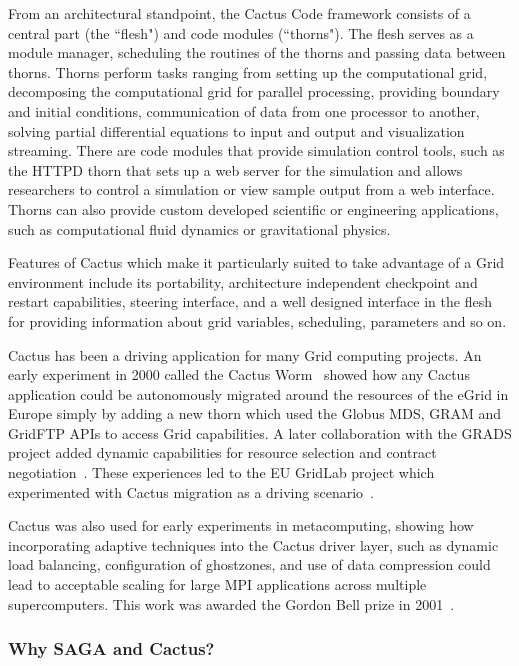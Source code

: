 \documentclass[conference,final]{IEEEtran}
\begin{document}
From an architectural standpoint, the Cactus Code framework consists
of a central part (the ``flesh") and code modules (``thorns").  The
flesh serves as a module manager, scheduling the routines of the
thorns and passing data between thorns.  Thorns perform tasks ranging
from setting up the computational grid, decomposing the computational
grid for parallel processing, providing boundary and initial
conditions, communication of data from one processor to another,
solving partial differential equations to input and output and
visualization streaming. There are code modules that provide
simulation control tools, such as the HTTPD thorn that sets up a web
server for the simulation and allows researchers to control a
simulation or view sample output from a web interface.  Thorns can
also provide custom developed scientific or engineering applications,
such as computational fluid dynamics or gravitational physics.

Features of Cactus which make it particularly suited to take advantage
of a Grid environment include its portability, architecture
independent checkpoint and restart capabilities, steering interface,
and a well designed interface in the flesh for providing information
about grid variables, scheduling, parameters and so on.

Cactus has been a driving application for many Grid computing
projects.  An early experiment in 2000 called the Cactus
Worm~\cite{X1} showed how any Cactus application could be autonomously
migrated around the resources of the eGrid in Europe simply by adding
a new thorn which used the Globus MDS, GRAM and GridFTP APIs to access
Grid capabilities. A later collaboration with the GRADS project added
dynamic capabilities for resource selection and contract
negotiation~\cite{X2}.  These experiences led to the EU GridLab
project which experimented with Cactus migration as a driving
scenario~\cite{X3}.

Cactus was also used for early experiments in metacomputing, showing
how incorporating adaptive techniques into the Cactus driver layer,
such as dynamic load balancing, configuration of ghostzones, and use
of data compression could lead to acceptable scaling for large MPI
applications across multiple supercomputers. This work was awarded the
Gordon Bell prize in 2001~\cite{Cactus_GordonBell}.

\subsubsection{Why SAGA and Cactus?} 
\end{document}
